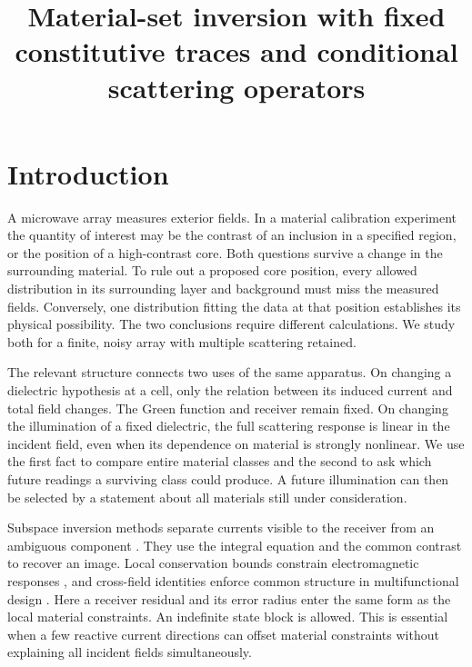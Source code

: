\documentclass[anonymous,12pt]{iopjournal}
\numberwithin{equation}{section}
\begin{document}
\par\vspace{1.8ex}
\title{Material-set inversion with fixed constitutive traces and conditional scattering operators}
\author{}

\par\smallskip
{}
\section{Introduction}
A microwave array measures exterior fields. In a material calibration experiment the quantity of interest may be the contrast of an inclusion in a specified region, or the position of a high-contrast core. Both questions survive a change in the surrounding material. To rule out a proposed core position, every allowed distribution in its surrounding layer and background must miss the measured fields. Conversely, one distribution fitting the data at that position establishes its physical possibility. The two conclusions require different calculations. We study both for a finite, noisy array with multiple scattering retained.

The relevant structure connects two uses of the same apparatus. On changing a dielectric hypothesis at a cell, only the relation between its induced current and total field changes. The Green function and receiver remain fixed. On changing the illumination of a fixed dielectric, the full scattering response is linear in the incident field, even when its dependence on material is strongly nonlinear. We use the first fact to compare entire material classes and the second to ask which future readings a surviving class could produce. A future illumination can then be selected by a statement about all materials still under consideration.

Subspace inversion methods separate currents visible to the receiver from an ambiguous component \cite{chen,zhong,ffttsom}. They use the integral equation and the common contrast to recover an image. Local conservation bounds constrain electromagnetic responses \cite{kuang,moleskylocal,trivedi}, and cross-field identities enforce common structure in multifunctional design \cite{shim}. Here a receiver residual and its error radius enter the same form as the local material constraints. An indefinite state block is allowed. This is essential when a few reactive current directions can offset material constraints without explaining all incident fields simultaneously.
\end{document}

